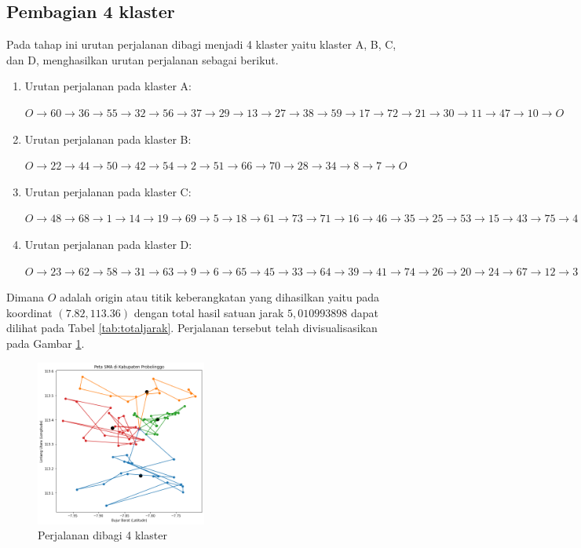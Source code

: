 \subsection{Pembagian 4 klaster}

Pada tahap ini urutan perjalanan dibagi menjadi 4 klaster yaitu klaster A, B, C, dan D, menghasilkan urutan perjalanan sebagai berikut.

\begin{enumerate}

\item Urutan perjalanan pada klaster A:

$O \to 60 \to 36 \to 55 \to 32 \to 56 \to 37 \to 29 \to 13 \to 27 \to 38 \to 59 \to 17 \to 72 \to 21 \to 30 \to 11 \to 47 \to 10 \to O$

\item Urutan perjalanan pada klaster B:

$O \to 22 \to 44 \to 50 \to 42 \to 54 \to 2 \to 51 \to 66 \to 70 \to 28 \to 34 \to 8 \to 7 \to O$

\item Urutan perjalanan pada klaster C:

$O \to 48 \to 68 \to 1 \to 14 \to 19 \to 69 \to 5 \to 18 \to 61 \to 73 \to 71 \to 16 \to 46 \to 35 \to 25 \to 53 \to 15 \to 43 \to 75 \to 4 \to 49 \to 40 \to 57 \to O$

\item Urutan perjalanan pada klaster D:

$O \to 23 \to 62 \to 58 \to 31 \to 63 \to 9 \to 6 \to 65 \to 45 \to 33 \to 64 \to 39 \to 41 \to 74 \to 26 \to 20 \to 24 \to 67 \to 12 \to 3 \to 52 \to O$

\end{enumerate}

Dimana $O$ adalah origin atau titik keberangkatan yang dihasilkan yaitu pada koordinat $(7.82, 113.36)$ dengan total hasil satuan jarak $5,010993898$ dapat dilihat pada Tabel \ref{tab:totaljarak}. Perjalanan tersebut telah divisualisasikan pada Gambar \ref{fig:hasil_mtsp4}.

\begin{figure}[H]
\centering
\includegraphics[width=0.5\textwidth]{Gambar/hasil_mtsp/4}
\caption{Perjalanan dibagi 4 klaster}
\label{fig:hasil_mtsp4}
\end{figure}

